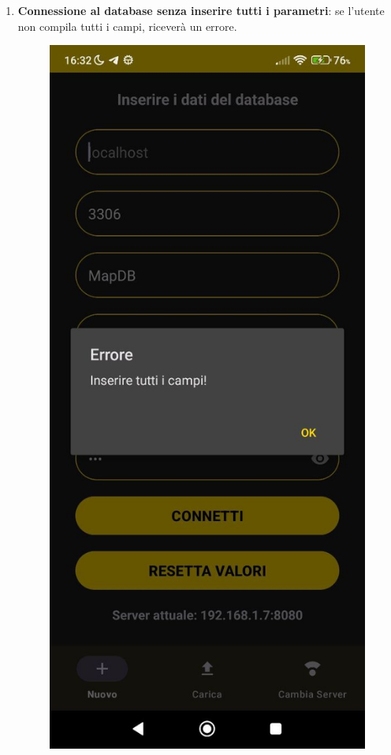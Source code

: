 \begin{enumerate}
\begin{itemize}[label=-]
\begin{figure}[H]
    \end{figure}
  \end{itemize}
  \item \textbf{Connessione al database senza inserire tutti i parametri}: se l'utente non compila tutti i campi, riceverà un errore.
    \begin{figure}[H]
      \centering
      \includegraphics[scale=0.2]{img/app5.png}

\end{figure}
\end{enumerate}
